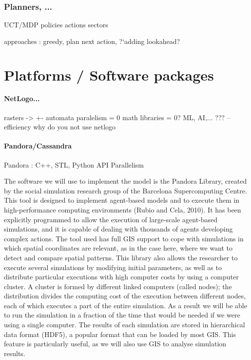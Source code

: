 \documentclass{report}
\begin{document}
\begin{enumeration}
\begin{end}
\subsection{Planners, ...}

	    UCT/MDP
	    policies
	    actions
	    sectors

	    approaches : greedy, plan next action, ?`adding lookahead?



\chapter{Platforms / Software packages}
		\subsubsection{NetLogo...}

		    rasters -> +- automata
		    paralelism = 0
		    math libraries = 0?
		    ML, AI,... ???
		    -- efficiency
		    why do you not use netlogo

		\subsubsection{Pandora/Cassandra}

		Pandora : C++, STL, Python API
		Parallelism %
	      
		The software we will use to implement the model is the Pandora Library, created by the social simulation
		research group of the Barcelona Supercomputing Centre. This tool is designed to implement agent-based 
		models and to execute them in high-performance computing environments (Rubio and Cela, 2010). It has been 
		explicitly programmed to allow the execution of large-scale agent-based simulations, and it is capable of 
		dealing with thousands of agents developing complex actions. The tool used has full GIS support to cope 
		with simulations in which spatial coordinates are relevant, as in the case here, where we want to detect 
		and compare spatial patterns. This library also allows the researcher to execute several simulations by 
		modifying initial parameters, as well as to distribute particular executions with high computer costs by 
		using a computer cluster. A cluster is formed by different linked computers (called nodes); the distribution 
		divides the computing cost of the execution between different nodes, each of which executes a part of the 
		entire simulation. As a result we will be able to run the simulation in a fraction of the time that would 
		be needed if we were using a single computer. The results of each simulation are stored in hierarchical data 
		format (HDF5), a popular format that can be loaded by most GIS. This feature is particularly useful, as we 
		will also use GIS to analyse simulation results.


\end{end}
\end{enumeration}
\end{document}

